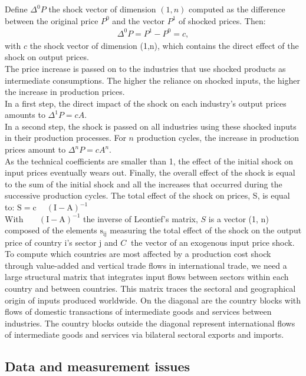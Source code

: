 \documentclass[11pt,a4paper]{article}
\begin{document}
Define ${{\Delta }^{0}}P$ the shock vector of dimension $(1, n)$ computed as the difference between the original price $P^0$ and the vector $P^1$ of shocked prices. Then:
\begin{eqnarray}
\Delta ^{0}P=P^1-P^0=c, 
\end{eqnarray}
with $c$ the shock vector of dimension (1,n), which contains the direct effect of the shock on output prices.\\
The price increase is passed on to the industries that use shocked products as intermediate consumptions. The higher the reliance on shocked inputs, the higher the increase in production prices.\\
In a first step, the direct impact of the shock on each industry's output prices amounts to $\Delta^{1}P=cA$.\\
In a second step, the shock is passed on all industries using these shocked inputs in their production processes. For $n$ production cycles, the increase in production prices amount to $\Delta^n P=cA^n$.\\
As the technical coefficients are smaller than 1, the effect of the initial shock on input prices eventually wears out. Finally, the overall effect of the shock is equal to the sum of the initial shock and all the increases that occurred during the successive production cycles. The total effect of the shock on prices, S, is equal to: 
	$\text{S}=\text{c }\!\!~\!\!\text{ }{{\left( \text{I}-\text{A} \right)}^{-1}}$\\
With $\text{ }\!\!~\!\!\text{ }{{\left( \text{I}-\text{A} \right)}^{-1}}$ the inverse of Leontief's matrix, $S$ is a vector (1, n) composed of the elements ${{\text{s}}_{\text{ij}}}$ measuring the total effect of the shock on the output price of country i's sector j and $C~$ the vector of an exogenous input price shock.\\
To compute which countries are most affected by a production cost shock through value-added and vertical trade flows in international trade, we need a large structural matrix that integrates input flows between sectors within each country and between countries. This matrix traces the sectoral and geographical origin of inputs produced worldwide. On the diagonal are the country blocks with flows of domestic transactions of intermediate goods and services between industries. The country blocks outside the diagonal represent international flows of intermediate goods and services via bilateral sectoral exports and imports. 


\subsection{Data and measurement issues}
\label{subsec:data}
\end{document}
